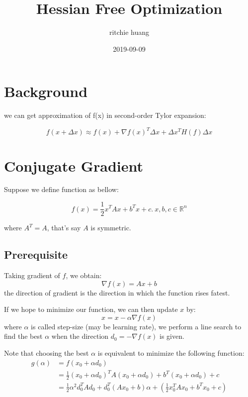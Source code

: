 \documentclass[titlepage,a4paper,12pt]{article}
\title{Hessian Free Optimization}
\author{ritchie huang}
\date{2019-09-09}
\begin{document}
\maketitle 

\tableofcontents
\newpage

\section{Background}\label{sec: background}

we can get approximation of f(x) in second-order Tylor expansion:

\begin{equation}
	f(x+\Delta x) \approx f(x)+\nabla f(x)^{T} \Delta x+\Delta x^{T} H(f) \Delta x
\end{equation}

\section{Conjugate Gradient}\label{sec: conjugate gradient}

Suppose we define function as bellow:

\begin{equation}
	f(x) = \frac{1}{2} x^{T} A x + b^{T} x + c. \ x, b, c \in \mathbb{R}^n
\end{equation}

where $A^{T} = A$, that's say $A$ is symmetric.

\subsection{Prerequisite}

Taking gradient of $f$, we obtain:
\begin{equation}
	\nabla f(x) = A x + b
\end{equation}
the direction of gradient is the direction in which the function rises fatest.

If we hope to minimize our function, we can then update $x$ by:
\begin{equation}
	x = x - \alpha \nabla f(x)
\end{equation}
where $\alpha$ is called step-size (may be learning rate), we perform a line search to find the best $\alpha$ when the direction $d_0 = - \nabla f(x)$ is given.

Note that choosing the best $\alpha$ is equivalent to minimize the following function:
\begin{equation}
\begin{aligned}
	g(\alpha) &= f(x_0 + \alpha d_0)\\
			  &= \frac{1}{2} (x_0 + \alpha d_0)^{T} A (x_0 + \alpha d_0) + b^{T} (x_0 + \alpha d_0) + c \\
			  &= \frac{1}{2} \alpha^2 d_0^{T} A d_0 + d_0^{T} (A x_0 + b) \alpha + \left( \frac{1}{2} x_0^{T} A x_0 + b^{T} x_0 + c \right)
\end{aligned}
\end{equation}
\end{document}
